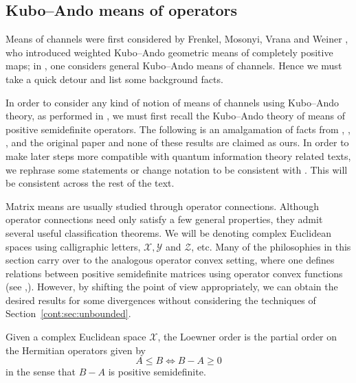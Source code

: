\subsection{Kubo--Ando means of operators} 
Means of channels were first considered by Frenkel, Mosonyi, Vrana and Weiner \cite{FMVW2025}, who introduced weighted Kubo--Ando geometric means of completely positive maps; in \cite{kian2026relative}, one considers general Kubo--Ando means of channels. Hence we must take a quick detour and list some background facts. 
 
In order to consider any kind of notion of means of channels using Kubo--Ando theory, as performed in \cite{kian2026relative}, we must first recall the Kubo--Ando theory of means of positive semidefinite operators. The following is an amalgamation of facts from \cite{bhatia1997matrix}, \cite{hiai2010matrix}, \cite{hiaipetz2014intro}, and the original paper \cite{KuboAndo1980} and none of these results are claimed as ours. In order to make later steps more compatible with quantum information theory related texts, we rephrase some statements or change notation to be consistent with \cite{watrous2018theory}. This will be consistent across the rest of the text.
 
Matrix means are usually studied through operator connections. Although operator connections need only satisfy a few general properties, they admit several useful classification theorems. We will be denoting complex Euclidean spaces using calligraphic letters, $\mathcal{X}, \mathcal{Y}$ and $\mathcal{Z}$, etc. Many of the philosophies in this section carry over to the analogous operator convex setting, where one defines relations between positive semidefinite matrices using operator convex functions (see \cite{hiaipetz2014intro},\cite{bhatia1997matrix}). However, by shifting the point of view appropriately, we can obtain the desired results for some divergences without considering the techniques of Section~\ref{cont:sec:unbounded}.
 
\begin{definition}
Given a complex Euclidean space $\mathcal{X}$, the Loewner order is the partial order on the Hermitian operators given by
\[
    A\leq B\iff B-A\geq 0
\]
in the sense that $B-A$ is positive semidefinite.
\end{definition}
 
